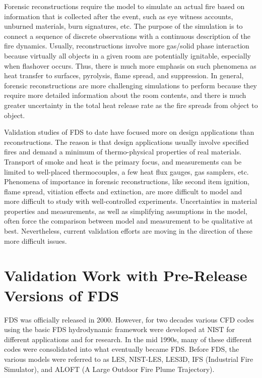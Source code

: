 Forensic reconstructions require the model to simulate an actual fire based on information that is collected after the event, such as eye witness accounts, unburned materials, burn signatures, etc. The purpose of the simulation is to connect a sequence of discrete observations with a continuous description of the fire dynamics. Usually, reconstructions involve more gas/solid phase interaction because virtually all objects in a given room are potentially ignitable, especially when flashover occurs. Thus, there is much more emphasis on such phenomena as heat transfer to surfaces, pyrolysis, flame spread, and suppression. In general, forensic reconstructions are more challenging simulations to perform because they require more detailed information about the room contents, and there is much greater uncertainty in the total heat release rate as the fire spreads from object to object.

Validation studies of FDS to date have focused more on design applications  than reconstructions. The  reason is  that design applications usually involve specified fires and demand a minimum of thermo-physical properties of real materials. Transport of smoke and heat is the primary focus, and measurements can be limited to well-placed thermocouples, a few heat flux gauges, gas samplers, etc. Phenomena of importance in forensic reconstructions, like second item ignition, flame spread, vitiation effects and extinction, are more difficult to model and  more difficult  to  study with well-controlled experiments. Uncertainties in material properties and measurements, as well as
simplifying assumptions in the model, often force the comparison between model and measurement to be qualitative at best. Nevertheless, current validation efforts are moving in the direction of these more difficult issues.



\section{Validation Work with Pre-Release Versions of FDS}

FDS was officially released in 2000. However, for two decades various CFD codes using the basic FDS hydrodynamic framework were developed at NIST for different applications and for research. In the mid 1990s, many of these different codes were consolidated into what eventually became FDS. Before FDS, the various models were referred to as LES, NIST-LES, LES3D, IFS (Industrial Fire Simulator), and ALOFT (A Large Outdoor Fire Plume Trajectory).

